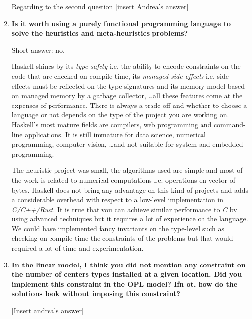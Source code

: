 \documentclass[12pt, a4paper]{article}
\begin{document}
\begin{enumerate}[label=\textbf{(\alph*)}]
    Regarding to the second question [insert Andrea's answer]

\item \textbf{Is it worth using a purely functional programming language to solve the heuristics and meta-heuristics problems?}

  Short answer: no.

  Haskell shines by its \textit{type-safety} i.e. the ability to encode constraints on the code that are checked on compile time, its \textit{managed side-effects} i.e. side-effects must be reflected on the type signatures and its memory model based on managed memory by a garbage collector, \ldots all these features come at the expenses of performance. There is always a trade-off and whether to choose a language or not depends on the type of the project you are working on. Haskell's most mature fields are compilers, web programming and command-line applications. It is still immature for data science, numerical programming, computer vision, \ldots and not suitable for system and embedded programming.

    The heuristic project was small, the algorithms used are simple and most of the work is related to numerical computations \i.e. operations on vector of bytes. Haskell does not bring any advantage on this kind of projects and adds a considerable overhead with respect to a low-level implementation in \textit{C/C++/Rust}. It is true that you can achieve similar performance to \textit{C} by using advanced techniques but it requires a lot of experience on the language. We could have implemented fancy invariants on the type-level such as checking on compile-time the constraints of the problems but that would required a lot of time and experimentation.

\item \textbf{In the linear model, I think you did not mention any constraint on the number of centers types installed at a given location. Did you implement this constraint in the OPL model? Ifn ot, how do the solutions look without imposing this constraint?}

  [Insert andrea's answer]

\end{enumerate}
\end{document}
